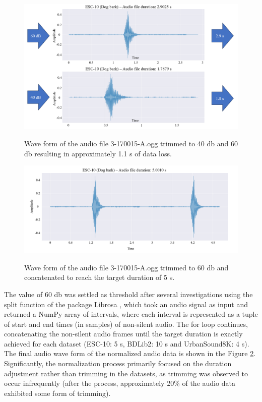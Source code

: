 \begin{figure}[htbp]
    \raggedright
        \caption{Wave form of the audio file 3-170015-A.ogg trimmed to 40 \gls{db} and 60 \gls{db} resulting in approximately 1.1 \gls{s} of data loss.}
        \includegraphics[width=1\textwidth]{resources/images/050-methods/Methods_normalization_comparison_40db_60db.png}
        \label{fig:methods_normalization_40_db_x_60_db_wave_form}
\end{figure}


\begin{figure}[htbp]
    \raggedright
        \caption{Wave form of the audio file 3-170015-A.ogg trimmed to 60 \gls{db} and concatenated to reach the target duration of 5 \gls{s}.}
        \includegraphics[width=1\textwidth]{resources/images/050-methods/Methods_normalization_normalized.png}
        \label{fig:methods_normalization_normalized_audio_data}
\end{figure}

The value of 60 \gls{db} was settled as threshold after several investigations using the split function of the package Librosa \cite{McFee2015librosa_sw}, which took an audio signal as input and returned a NumPy array of intervals, where each interval is represented as a tuple of start and end times (in samples) of non-silent audio. The for loop continues, concatenating the non-silent audio frames until the target duration is exactly achieved for each dataset (ESC-10: 5 \gls{s}, BDLib2: 10 \gls{s} and UrbanSound8K: 4 \gls{s}). The final audio wave form of the normalized audio data is shown in the Figure \ref{fig:methods_normalization_normalized_audio_data}. Significantly, the normalization process primarily focused on the duration adjustment rather than trimming in the datasets, as trimming was observed to occur infrequently (after the process, approximately 20\% of the audio data exhibited some form of trimming).


